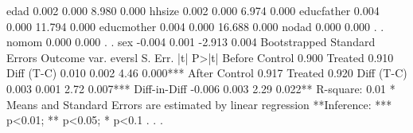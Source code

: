 edad                 {\VBAR} 0.002      {\VBAR} 0.000     {\VBAR} 8.980   {\VBAR} 0.000
hhsize               {\VBAR} 0.002      {\VBAR} 0.000     {\VBAR} 6.974   {\VBAR} 0.000
educfather           {\VBAR} 0.004      {\VBAR} 0.000     {\VBAR} 11.794  {\VBAR} 0.000
educmother           {\VBAR} 0.004      {\VBAR} 0.000     {\VBAR} 16.688  {\VBAR} 0.000
nodad                {\VBAR} 0.000      {\VBAR} 0.000     {\VBAR}     .   {\VBAR}     .
nomom                {\VBAR} 0.000      {\VBAR} 0.000     {\VBAR}     .   {\VBAR}     .
sex                  {\VBAR} -0.004     {\VBAR} 0.001     {\VBAR} -2.913  {\VBAR} 0.004
Bootstrapped Standard Errors
{\smallskip}
 Outcome var.   {\VBAR} evers{\tytilde}l {\VBAR} S. Err. {\VBAR}   |t|   {\VBAR}  P>|t|
Before          {\VBAR}         {\VBAR}         {\VBAR}         {\VBAR} 
   Control      {\VBAR} 0.900   {\VBAR}         {\VBAR}         {\VBAR} 
   Treated      {\VBAR} 0.910   {\VBAR}         {\VBAR}         {\VBAR} 
   Diff (T-C)   {\VBAR} 0.010   {\VBAR} 0.002   {\VBAR} 4.46    {\VBAR} 0.000***
After           {\VBAR}         {\VBAR}         {\VBAR}         {\VBAR} 
   Control      {\VBAR} 0.917   {\VBAR}         {\VBAR}         {\VBAR} 
   Treated      {\VBAR} 0.920   {\VBAR}         {\VBAR}         {\VBAR} 
   Diff (T-C)   {\VBAR} 0.003   {\VBAR} 0.001   {\VBAR} 2.72    {\VBAR} 0.007***
                {\VBAR}         {\VBAR}         {\VBAR}         {\VBAR} 
Diff-in-Diff    {\VBAR} -0.006  {\VBAR} 0.003   {\VBAR} 2.29    {\VBAR} 0.022**
R-square:    0.01
* Means and Standard Errors are estimated by linear regression
**Inference: *** p<0.01; ** p<0.05; * p<0.1
{\smallskip}
. 
. 
. 
